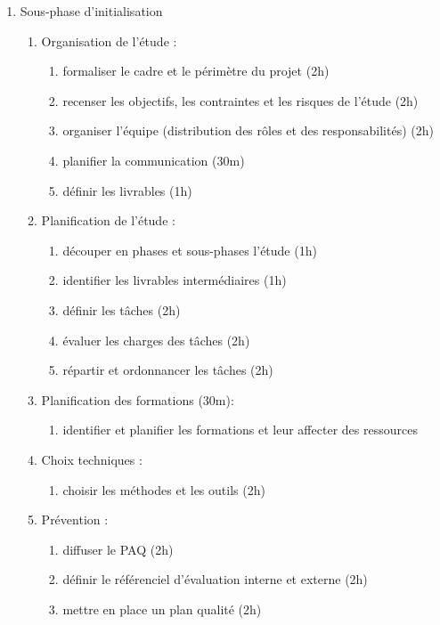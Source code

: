 \begin{enumerate}
  \item Sous-phase d'initialisation
          \begin{enumerate}
            \item Organisation de l'étude :
              \begin{enumerate}
                  \item formaliser le cadre et le périmètre du projet (2h)
                  \item  recenser les objectifs, les contraintes et les risques de l'étude (2h)
                  \item  organiser l'équipe (distribution des rôles et des responsabilités) (2h)
                  \item  planifier la communication (30m)
                  \item  définir les livrables (1h)
              \end{enumerate}
            \item Planification de l'étude : 
              \begin{enumerate}
                  \item  découper en phases et sous-phases l'étude (1h)
                  \item  identifier les livrables intermédiaires (1h)
                  \item  définir les tâches (2h)
                  \item  évaluer les charges des tâches (2h)
                  \item  répartir et ordonnancer les tâches (2h)
              \end{enumerate}

            \item Planification des formations (30m):
                \begin{enumerate}
                  \item identifier et planifier les formations et leur affecter des ressources
                \end{enumerate}
            \item Choix techniques : 
                \begin{enumerate}
                  \item choisir les méthodes et les outils (2h)
                \end{enumerate}

            \item Prévention :
                \begin{enumerate}
                  \item diffuser le PAQ (2h)
                  \item définir le référenciel d'évaluation interne et externe (2h)
                  \item mettre en place un plan qualité (2h)
                \end{enumerate}


\end{enumerate}
\end{enumerate}

